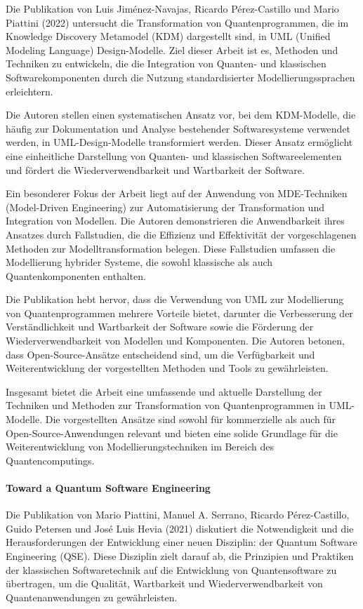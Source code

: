Die Publikation von Luis Jiménez-Navajas, Ricardo Pérez-Castillo und Mario Piattini (2022) untersucht die 
Transformation von Quantenprogrammen, die im Knowledge Discovery Metamodel (KDM) dargestellt sind, in 
UML (Unified Modeling Language) Design-Modelle. Ziel dieser Arbeit ist es, Methoden und Techniken zu 
entwickeln, die die Integration von Quanten- und klassischen Softwarekomponenten durch die Nutzung 
standardisierter Modellierungssprachen erleichtern.

Die Autoren stellen einen systematischen Ansatz vor, bei dem KDM-Modelle, die häufig zur Dokumentation und 
Analyse bestehender Softwaresysteme verwendet werden, in UML-Design-Modelle transformiert werden. Dieser Ansatz 
ermöglicht eine einheitliche Darstellung von Quanten- und klassischen Softwareelementen und fördert die 
Wiederverwendbarkeit und Wartbarkeit der Software.

Ein besonderer Fokus der Arbeit liegt auf der Anwendung von MDE-Techniken (Model-Driven Engineering) zur Automatisierung 
der Transformation und Integration von Modellen. Die Autoren demonstrieren die Anwendbarkeit ihres Ansatzes durch 
Fallstudien, die die Effizienz und Effektivität der vorgeschlagenen Methoden zur Modelltransformation belegen. 
Diese Fallstudien umfassen die Modellierung hybrider Systeme, die sowohl klassische als auch Quantenkomponenten enthalten.

Die Publikation hebt hervor, dass die Verwendung von UML zur Modellierung von Quantenprogrammen mehrere Vorteile 
bietet, darunter die Verbesserung der Verständlichkeit und Wartbarkeit der Software sowie die Förderung der 
Wiederverwendbarkeit von Modellen und Komponenten. Die Autoren betonen, dass Open-Source-Ansätze entscheidend sind, um 
die Verfügbarkeit und Weiterentwicklung der vorgestellten Methoden und Tools zu gewährleisten.

Insgesamt bietet die Arbeit eine umfassende und aktuelle Darstellung der Techniken und Methoden zur Transformation von 
Quantenprogrammen in UML-Modelle. Die vorgestellten Ansätze sind sowohl für kommerzielle als auch für Open-Source-Anwendungen 
relevant und bieten eine solide Grundlage für die Weiterentwicklung von Modellierungstechniken im Bereich des Quantencomputings.

\paragraph{Toward a Quantum Software Engineering}

Die Publikation von Mario Piattini, Manuel A. Serrano, Ricardo Pérez-Castillo, Guido Petersen und José Luis Hevia (2021) 
diskutiert die Notwendigkeit und die Herausforderungen der Entwicklung einer neuen Disziplin: der Quantum Software 
Engineering (QSE). Diese Disziplin zielt darauf ab, die Prinzipien und Praktiken der klassischen Softwaretechnik 
auf die Entwicklung von Quantensoftware zu übertragen, um die Qualität, Wartbarkeit und Wiederverwendbarkeit von 
Quantenanwendungen zu gewährleisten.

